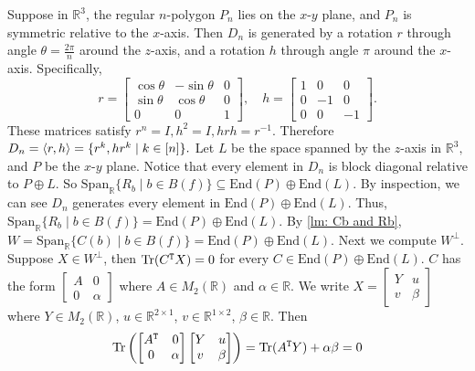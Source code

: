 Suppose in $\mathbb{R}^3$, the regular $n$-polygon $P_n$ lies on the $x$-$y$ plane, and $P_n$ is symmetric relative to the $x$-axis.
Then $D_{n}$ is generated by a rotation $r$ through angle $\theta=\frac{2\pi}{n}$ around the $z$-axis, and a rotation $h$ through angle $\pi$ around the $x$-axis.
Specifically,
$$r=\left[\begin{matrix}
    \cos \theta & -\sin \theta &0\\
    \sin \theta & \cos \theta & 0\\
    0 & 0 & 1
\end{matrix}\right],\quad
h=\left[\begin{matrix}
    1 & 0 & 0\\
    0 & -1 & 0\\
    0 & 0 & -1
\end{matrix}\right].
$$
These matrices satisfy $r^n=I,h^2=I,hrh=r^{-1}.$
Therefore $D_n=\braket{r,h}=\{r^k,hr^k\mid k\in[n]\}.$
Let $L$ be the space spanned by the $z$-axis in $\mathbb{R}^3,$ and $P$ be the $x$-$y$ plane.
Notice that every element in $D_n$ is block diagonal relative to $P\oplus L.$
So $\mathrm{Span}_{\mathbb{R}}\{R_b\mid b\in B(f)\}\subseteq\mathrm{End}(P)\oplus \mathrm{End}(L)$.
By inspection, we can see $D_n$ generates every element in $\mathrm{End}(P)\oplus \mathrm{End}(L)$.
Thus, $\mathrm{Span}_{\mathbb{R}}\{R_b\mid b\in B(f)\}=\mathrm{End}(P)\oplus \mathrm{End}(L)$.
By \cref{lm: Cb and Rb}, $W=\mathrm{Span}_{\mathbb{R}}\{C(b)\mid b\in B(f)\}=\mathrm{End}(P)\oplus \mathrm{End}(L).$
Next we compute $W^\perp.$
Suppose $X\in W^\perp$, then $\mathrm{Tr}(C^{\tt T}X)=0$ for every $C\in \mathrm{End}(P)\oplus \mathrm{End}(L).$
$C$ has the form $\left[\begin{smallmatrix}
    A & 0\\
    0 & \alpha
\end{smallmatrix}\right]$ where $A\in M_2(\mathbb{R})$ and $\alpha\in \mathbb{R}$.
We write $X=\left[\begin{smallmatrix}
    Y & u\\
    v & \beta
\end{smallmatrix}\right]$ where $Y\in M_{2}(\mathbb{R})$, $u\in \mathbb{R}^{2\times 1}$, $v\in \mathbb{R}^{1\times 2}$, $\beta\in \mathbb{R}$.
Then 
$$
\mathrm{Tr}\left(
\left[\begin{matrix}
    A^{\tt T} & 0\\
    0 & \alpha
\end{matrix}\right]
\left[\begin{matrix}
    Y & u\\
    v & \beta
\end{matrix}\right]
\right)
=\mathrm{Tr}(A^{\tt T}Y)+\alpha\beta=0
$$
